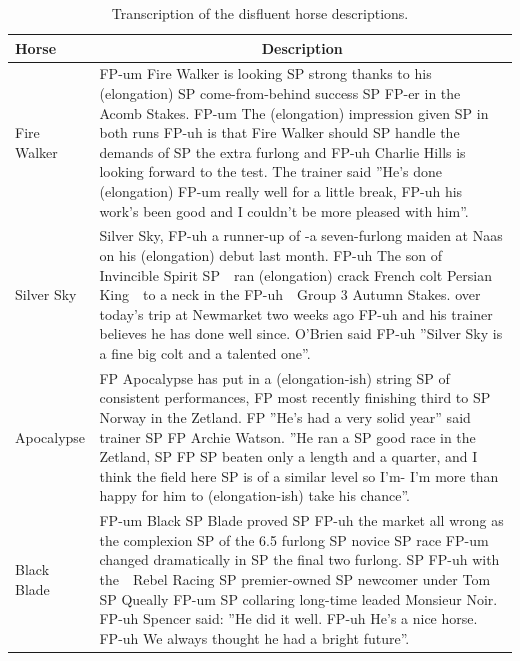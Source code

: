 \documentclass[
  man,floatsintext]{apa6}
\begin{document}
\begin{table}[tbp]

\begin{center}
\begin{threeparttable}

\caption{\label{tab:tab-horse-description-disfluent}Transcription of the disfluent horse descriptions.}

\begin{tabular}{m{2cm}m{13cm}}
\toprule
Horse & \multicolumn{1}{c}{Description}\\
\midrule
Fire Walker & FP-um Fire Walker is looking SP strong thanks to his (elongation) SP come-from-behind success SP FP-er in the Acomb Stakes. FP-um The (elongation) impression given SP in both runs FP-uh is that Fire Walker should SP handle the demands of SP the extra furlong and FP-uh Charlie Hills is looking forward to the test. The trainer said ''He's done (elongation) FP-um really well for a little break, FP-uh his work's been good and I couldn't be more pleased with him''.\\
Silver Sky & Silver Sky, FP-uh a runner-up of -a seven-furlong maiden at Naas on his (elongation) debut last month. FP-uh The son of Invincible Spirit SP\ \ ran (elongation) crack French colt Persian King\ \  to a neck in the FP-uh\ \ Group 3 Autumn Stakes. over today's trip at Newmarket two weeks ago FP-uh and his trainer believes he has done well since. O'Brien said FP-uh ''Silver Sky is a fine big colt and a talented one''.\\
Apocalypse & FP Apocalypse has put in a (elongation-ish) string SP of consistent performances, FP most recently finishing third to SP Norway in the Zetland. FP ''He's had a very solid year'' said trainer SP FP Archie Watson. ''He ran a SP good race in the Zetland, SP FP SP beaten only a length and a quarter, and I think the field here SP is of a similar level so I'm- I'm more than happy for him to (elongation-ish) take his chance''.\\
Black Blade & FP-um Black SP Blade proved SP FP-uh the market all wrong as the complexion SP of the 6.5 furlong SP novice SP race FP-um changed dramatically in SP the final two furlong. SP FP-uh with the\ \ Rebel Racing SP premier-owned SP newcomer under Tom SP Queally FP-um SP collaring long-time leaded Monsieur Noir. FP-uh Spencer said: ''He did it well. FP-uh He's a nice horse. FP-uh We always thought he had a bright future''.\\
\bottomrule
\end{tabular}

\end{threeparttable}
\end{center}

\end{table}
\end{document}
